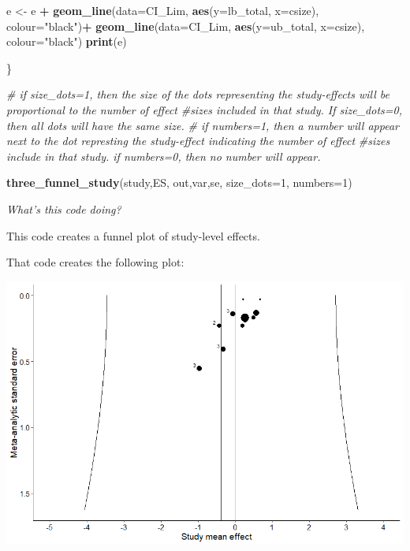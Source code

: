 \documentclass[
]{book}
\newenvironment{Shaded}{\begin{snugshade}}{\end{snugshade}}
\newcommand{\AttributeTok}[1]{\textcolor[rgb]{0.13,0.29,0.53}{#1}}
\newcommand{\CommentTok}[1]{\textcolor[rgb]{0.56,0.35,0.01}{\textit{#1}}}
\newcommand{\DecValTok}[1]{\textcolor[rgb]{0.00,0.00,0.81}{#1}}
\newcommand{\FunctionTok}[1]{\textcolor[rgb]{0.13,0.29,0.53}{\textbf{#1}}}
\newcommand{\NormalTok}[1]{#1}
\newcommand{\OtherTok}[1]{\textcolor[rgb]{0.56,0.35,0.01}{#1}}
\newcommand{\SpecialCharTok}[1]{\textcolor[rgb]{0.81,0.36,0.00}{\textbf{#1}}}
\newcommand{\StringTok}[1]{\textcolor[rgb]{0.31,0.60,0.02}{#1}}
\begin{document}
\begin{Shaded}
\begin{Highlighting}[]
\NormalTok{  e }\OtherTok{\textless{}{-}}\NormalTok{ e }\SpecialCharTok{+} \FunctionTok{geom\_line}\NormalTok{(}\AttributeTok{data=}\NormalTok{CI\_Lim, }\FunctionTok{aes}\NormalTok{(}\AttributeTok{y=}\NormalTok{lb\_total, }\AttributeTok{x=}\NormalTok{csize), }\AttributeTok{colour=}\StringTok{"black"}\NormalTok{)}\SpecialCharTok{+}
    \FunctionTok{geom\_line}\NormalTok{(}\AttributeTok{data=}\NormalTok{CI\_Lim, }\FunctionTok{aes}\NormalTok{(}\AttributeTok{y=}\NormalTok{ub\_total, }\AttributeTok{x=}\NormalTok{csize), }\AttributeTok{colour=}\StringTok{"black"}\NormalTok{)}
  \FunctionTok{print}\NormalTok{(e)}
  
\NormalTok{\} }


\CommentTok{\# if size\_dots=1, then the size of the dots representing the study{-}effects will be proportional to the number of effect}
\CommentTok{\#sizes included in that study. If size\_dots=0, then all dots will have the same size.}
\CommentTok{\# if numbers=1, then a number will appear next to the dot represting the study{-}effect indicating the number of effect}
\CommentTok{\#sizes include in that study. if numbers=0, then no number will appear.}

\FunctionTok{three\_funnel\_study}\NormalTok{(study,ES, out,var,se, }\AttributeTok{size\_dots=}\DecValTok{1}\NormalTok{, }\AttributeTok{numbers=}\DecValTok{1}\NormalTok{)}
\end{Highlighting}
\end{Shaded}

\emph{What's this code doing?}

This code creates a funnel plot of study-level effects.

That code creates the following plot:

\includegraphics{images/funnel_study.png}
\end{document}

